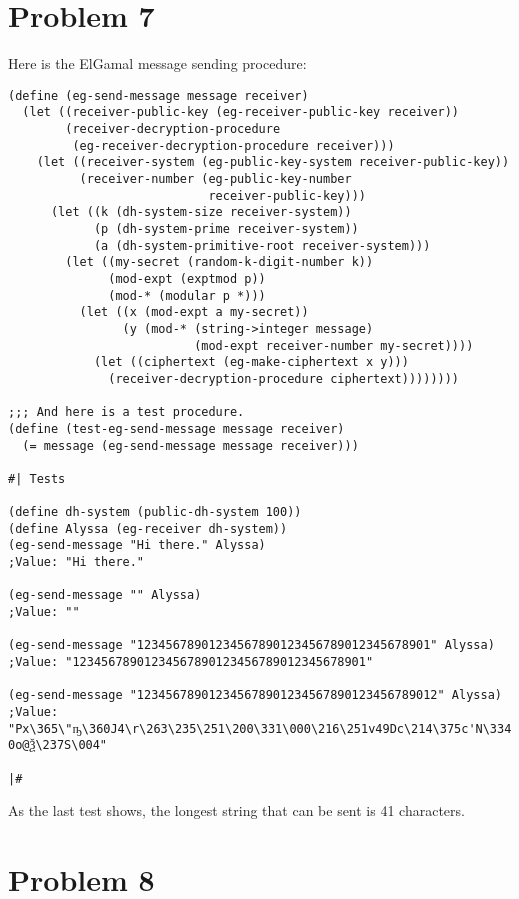 \documentclass[12pt]{article}
\begin{document}
\section{Problem 7}

Here is the ElGamal message sending procedure:
\begin{verbatim}
(define (eg-send-message message receiver)
  (let ((receiver-public-key (eg-receiver-public-key receiver))
        (receiver-decryption-procedure
         (eg-receiver-decryption-procedure receiver)))
    (let ((receiver-system (eg-public-key-system receiver-public-key))
          (receiver-number (eg-public-key-number
                            receiver-public-key)))
      (let ((k (dh-system-size receiver-system))
            (p (dh-system-prime receiver-system))
            (a (dh-system-primitive-root receiver-system)))
        (let ((my-secret (random-k-digit-number k))
              (mod-expt (exptmod p))
              (mod-* (modular p *)))
          (let ((x (mod-expt a my-secret))
                (y (mod-* (string->integer message)
                          (mod-expt receiver-number my-secret))))
            (let ((ciphertext (eg-make-ciphertext x y)))
              (receiver-decryption-procedure ciphertext))))))))

;;; And here is a test procedure.
(define (test-eg-send-message message receiver)
  (= message (eg-send-message message receiver)))

#| Tests

(define dh-system (public-dh-system 100))
(define Alyssa (eg-receiver dh-system))
(eg-send-message "Hi there." Alyssa)
;Value: "Hi there."

(eg-send-message "" Alyssa)
;Value: ""

(eg-send-message "12345678901234567890123456789012345678901" Alyssa)
;Value: "12345678901234567890123456789012345678901"

(eg-send-message "123456789012345678901234567890123456789012" Alyssa)
;Value:
"Px\365\"ҧ\360J4\r\263\235\251\200\331\000\216\251v49Dc\214\375c'N\334E\254\251\001Z\\03\
0o@Ѯ\237S\004"

|#
\end{verbatim}

As the last test shows, the longest string that can be sent is 41
characters.

\section{Problem 8}
\end{document}

